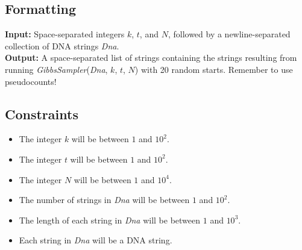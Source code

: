 \documentclass{article}
\begin{document}
\subsection*{Formatting}
\noindent\textbf{Input:} Space-separated integers $k$, $t$, and $N$, followed by a newline-separated collection of DNA strings \emph{Dna}.\\
\noindent\textbf{Output:} A space-separated list of strings containing the strings resulting from running \emph{GibbsSampler}(\emph{Dna}, $k$, $t$, $N$) with 20 random starts. Remember to use pseudocounts!

\subsection*{Constraints}
\begin{itemize}
    \item The integer $k$ will be between $1$ and $10^2$.
    \item The integer $t$ will be between $1$ and $10^2$.
    \item The integer $N$ will be between $1$ and $10^4$.
    \item The number of strings in \emph{Dna} will be between $1$ and $10^2$.
    \item The length of each string in \emph{Dna} will be between $1$ and $10^3$.
    \item Each string in \emph{Dna} will be a DNA string.
\end{itemize}
\pagebreak
\end{document}

